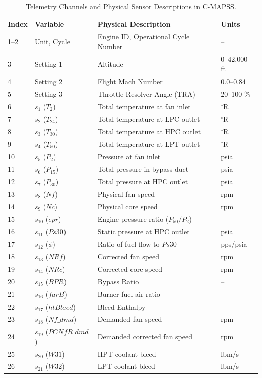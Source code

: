 \documentclass[12pt,a4paper,oneside]{report}
\begin{document}
\begin{table}[htbp]
    \centering
    \small
    \caption{Telemetry Channels and Physical Sensor Descriptions in C-MAPSS.}
    \label{tab:sensor_desc}
    \begin{tabular}{llll}
        \toprule
        \textbf{Index} & \textbf{Variable} & \textbf{Physical Description} & \textbf{Units} \\
        \midrule
        1--2 & Unit, Cycle & Engine ID, Operational Cycle Number & -- \\
        3 & Setting 1 & Altitude & 0--42,000 ft \\
        4 & Setting 2 & Flight Mach Number & 0.0--0.84 \\
        5 & Setting 3 & Throttle Resolver Angle (TRA) & 20--100 \% \\
        6 & $s_1$ ($T_2$) & Total temperature at fan inlet & $^\circ$R \\
        7 & $s_2$ ($T_{24}$) & Total temperature at LPC outlet & $^\circ$R \\
        8 & $s_3$ ($T_{30}$) & Total temperature at HPC outlet & $^\circ$R \\
        9 & $s_4$ ($T_{50}$) & Total temperature at LPT outlet & $^\circ$R \\
        10 & $s_5$ ($P_2$) & Pressure at fan inlet & psia \\
        11 & $s_6$ ($P_{15}$) & Total pressure in bypass-duct & psia \\
        12 & $s_7$ ($P_{30}$) & Total pressure at HPC outlet & psia \\
        13 & $s_8$ ($Nf$) & Physical fan speed & rpm \\
        14 & $s_9$ ($Nc$) & Physical core speed & rpm \\
        15 & $s_{10}$ ($epr$) & Engine pressure ratio ($P_{50}/P_2$) & -- \\
        16 & $s_{11}$ ($Ps30$) & Static pressure at HPC outlet & psia \\
        17 & $s_{12}$ ($\phi$) & Ratio of fuel flow to $Ps30$ & pps/psia \\
        18 & $s_{13}$ ($NRf$) & Corrected fan speed & rpm \\
        19 & $s_{14}$ ($NRc$) & Corrected core speed & rpm \\
        20 & $s_{15}$ ($BPR$) & Bypass Ratio & -- \\
        21 & $s_{16}$ ($farB$) & Burner fuel-air ratio & -- \\
        22 & $s_{17}$ ($htBleed$) & Bleed Enthalpy & -- \\
        23 & $s_{18}$ ($Nf\_dmd$) & Demanded fan speed & rpm \\
        24 & $s_{19}$ ($PCNfR\_dmd$) & Demanded corrected fan speed & rpm \\
        25 & $s_{20}$ ($W31$) & HPT coolant bleed & lbm/s \\
        26 & $s_{21}$ ($W32$) & LPT coolant bleed & lbm/s \\
        \bottomrule
    \end{tabular}
\end{table}
\end{document}
